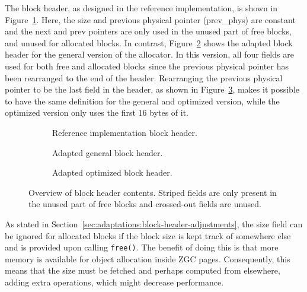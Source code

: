 The block header, as designed in the reference implementation, is shown in Figure~\ref{fig:blockheader_adap_reference}. Here, the size and previous physical pointer (prev\_phys) are constant and the next and prev pointers are only used in the unused part of free blocks, and unused for allocated blocks. In contrast, Figure~\ref{fig:blockheader_adap_general} shows the adapted block header for the general version of the allocator. In this version, all four fields are used for both free and allocated blocks since the previous physical pointer has been rearranged to the end of the header. Rearranging the previous physical pointer to be the last field in the header, as shown in Figure~\ref{fig:blockheader_adap_optimized}, makes it possible to have the same definition for the general and optimized version, while the optimized version only uses the first 16 bytes of it.

\begin{figure}[H]
    \centering
    \begin{subfigure}[b]{0.3\textwidth}
        \centering
        
        \caption{Reference implementation block header.}
        \label{fig:blockheader_adap_reference}
    \end{subfigure}%
    \hfill
    \begin{subfigure}[b]{0.3\textwidth}
        \centering
        
        \caption{Adapted general block header.}
        \label{fig:blockheader_adap_general}
    \end{subfigure}%
    \hfill
    \begin{subfigure}[b]{0.3\textwidth}
        \centering
        
        \caption{Adapted optimized block header.}
        \label{fig:blockheader_adap_optimized}
    \end{subfigure}
    \caption{Overview of block header contents. Striped fields are only present in the unused part of free blocks and crossed-out fields are unused.}
    \label{fig:blockheader_adaptations}
\end{figure}

As stated in Section~\ref{sec:adaptations:block-header-adjustments}, the size field can be ignored for allocated blocks if the block size is kept track of somewhere else and is provided upon calling \texttt{free()}. The benefit of doing this is that more memory is available for object allocation inside ZGC pages. Consequently, this means that the size must be fetched and perhaps computed from elsewhere, adding extra operations, which might decrease performance. 

